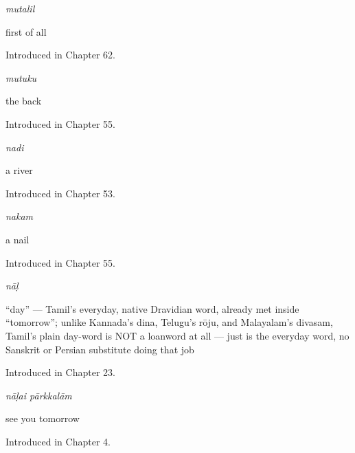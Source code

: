 \noindent\begin{minipage}[t]{\linewidth}
\raggedright
\textbf{}\enspace\emph{mutalil}\par
\small first of all\par
\footnotesize Introduced in Chapter 62.
\end{minipage}\par\medskip

\noindent\begin{minipage}[t]{\linewidth}
\raggedright
\textbf{}\enspace\emph{mutuku}\par
\small the back\par
\footnotesize Introduced in Chapter 55.
\end{minipage}\par\medskip

\noindent\begin{minipage}[t]{\linewidth}
\raggedright
\textbf{}\enspace\emph{nadi}\par
\small a river\par
\footnotesize Introduced in Chapter 53.
\end{minipage}\par\medskip

\noindent\begin{minipage}[t]{\linewidth}
\raggedright
\textbf{}\enspace\emph{nakam}\par
\small a nail\par
\footnotesize Introduced in Chapter 55.
\end{minipage}\par\medskip

\noindent\begin{minipage}[t]{\linewidth}
\raggedright
\textbf{}\enspace\emph{nāḷ}\par
\small \textquotedblleft{}day\textquotedblright{} — Tamil's everyday, native Dravidian word, already met inside \textquotedblleft{}tomorrow\textquotedblright{}; unlike Kannada's dina, Telugu's rōju, and Malayalam's divasam, Tamil's plain day-word is NOT a loanword at all —  just is the everyday word, no Sanskrit or Persian substitute doing that job\par
\footnotesize Introduced in Chapter 23.
\end{minipage}\par\medskip

\noindent\begin{minipage}[t]{\linewidth}
\raggedright
\textbf{ }\enspace\emph{nāḷai pārkkalām}\par
\small see you tomorrow\par
\footnotesize Introduced in Chapter 4.
\end{minipage}\par\medskip

